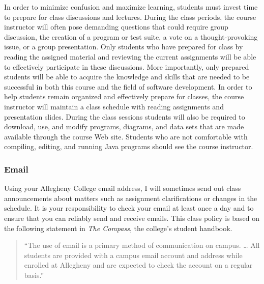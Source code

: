 
  In order to minimize confusion and maximize learning, students must invest time to prepare for class discussions and
  lectures.  During the class periods, the course instructor will often pose demanding questions that could require group
  discussion, the creation of a program or test suite, a vote on a thought-provoking issue, or a group presentation.
  Only students who have prepared for class by reading the assigned material and reviewing the current assignments will be
  able to effectively participate in these discussions.  More importantly, only prepared students will be able to acquire
  the knowledge and skills that are needed to be successful in both this course and the field of software development.  In
  order to help students remain organized and effectively prepare for classes, the course instructor will maintain a class
  schedule with reading assignments and presentation slides.   During the class sessions students will also be required to
  download, use, and modify programs, diagrams, and data sets that are made available through the course Web site.
  Students who are not comfortable with compiling, editing, and running Java programs should see the course instructor.

  \subsubsection*{Email}

  Using your Allegheny College email address, I will sometimes send out class announcements about matters such as
  assignment clarifications or changes in the schedule. It is your responsibility to check your email at least once a day
  and to ensure that you can reliably send and receive emails. This class policy is based on the following statement in
  {\em The Compass}, the college's student handbook.

  \vspace*{-.1in}
  \begin{quote}
    ``The use of email is a primary method of communication on campus. \ldots
    All students are provided with a campus email account and address while
    enrolled at Allegheny and are expected to check the account on a regular
    basis.'' 
  \end{quote}
  \vspace*{-.15in}

